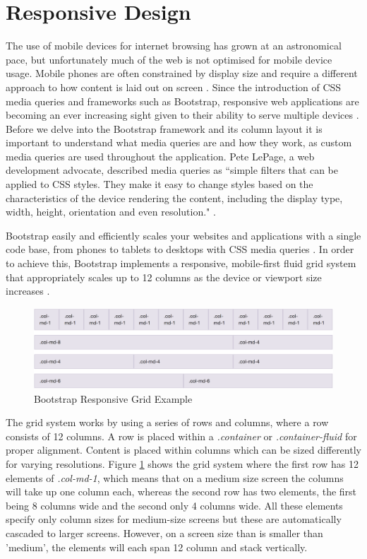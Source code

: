 \section{Responsive Design}
The use of mobile devices for internet browsing has grown at an astronomical pace, but unfortunately much of the web is not optimised for mobile device usage. Mobile phones are often constrained by display size and require a different approach to how content is laid out on screen \cite{GoogleDev:Responsiveness}. Since the introduction of CSS media queries and frameworks such as Bootstrap, responsive web applications are becoming an ever increasing sight given to their ability to serve multiple devices \cite{Bootstrap:Home}. Before we delve into the Bootstrap framework and its column layout it is important to understand what media queries are and how they work, as custom media queries are used throughout the application. Pete LePage, a web development advocate, described media queries as ``simple filters that can be applied to CSS styles. They make it easy to change styles based on the characteristics of the device rendering the content, including the display type, width, height, orientation and even resolution." \cite{GoogleDev:Responsiveness}.

Bootstrap easily and efficiently scales your websites and applications with a single code base, from phones to tablets to desktops with CSS media queries \cite{Bootstrap:Home}. In order to achieve this, Bootstrap implements a responsive, mobile-first fluid grid system that appropriately scales up to 12 columns as the device or viewport size increases \cite{Bootstrap:Grid}.

\begin{figure}[H]
\centering
\includegraphics[width=1.0\textwidth]{Images/Implementation/BootstrapGrid}
\caption{Bootstrap Responsive Grid Example} 
\label{fig:BootstrapGrid}
\end{figure}

The grid system works by using a series of rows and columns, where a row consists of 12 columns. A row is placed within a \emph{.container} or \emph{.container-fluid} for proper alignment. Content is placed within columns which can be sized differently for varying resolutions. Figure \ref{fig:BootstrapGrid} shows the grid system where the first row has 12 elements of \emph{.col-md-1}, which means that on a medium size screen the columns will take up one column each, whereas the second row has two elements, the first being 8 columns wide and the second only 4 columns wide. All these elements specify only column sizes for medium-size screens but these are automatically cascaded to larger screens. However, on a screen size than is smaller than 'medium', the elements will each span 12 column and stack vertically. 

